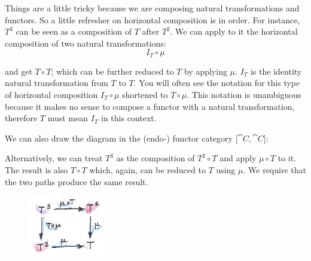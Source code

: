Things are a little tricky because we are composing natural
transformations and functors. So a little refresher on horizontal
composition is in order. For instance, $T^3$ can be seen as a
composition of $T$ after $T^2$. We can apply to it the
horizontal composition of two natural transformations:
\[I_T \circ \mu\]

\begin{figure}[H]
\centering
{}
\end{figure}

\noindent
and get $T \circ T$; which can be further reduced to $T$ by
applying $\mu$. $I_T$ is the identity natural transformation
from $T$ to $T$. You will often see the notation for this
type of horizontal composition $I_T \circ \mu$ shortened to
$T \circ \mu$. This notation is unambiguous because it makes no sense to
compose a functor with a natural transformation, therefore $T$
must mean $I_T$ in this context.

\noindent
We can also draw the diagram in the (endo-) functor category ${[}\cat{C}, \cat{C}{]}$:

\begin{figure}[H]
\centering
{}
\end{figure}

\noindent
Alternatively, we can treat $T^3$ as the composition of
$T^2 \circ T$ and apply $\mu \circ T$ to it. The result is also
$T \circ T$ which, again, can be reduced to $T$ using $\mu$. We
require that the two paths produce the same result.

\begin{figure}[H]
\centering
\includegraphics[width=0.3\textwidth]{images/assoc.png}
\end{figure}

